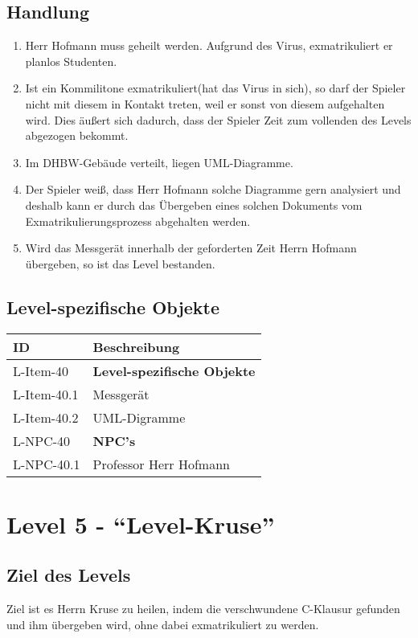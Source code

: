 \subsection{Handlung}
\begin{enumerate}
\item Herr Hofmann muss geheilt werden. Aufgrund des Virus, exmatrikuliert er planlos Studenten. 
\item Ist ein Kommilitone exmatrikuliert(hat das Virus in sich), so darf der Spieler nicht mit diesem in Kontakt treten, weil er sonst von diesem aufgehalten wird. Dies äußert sich dadurch, dass der Spieler Zeit zum vollenden des Levels abgezogen bekommt. 
\item Im DHBW-Gebäude verteilt, liegen UML-Diagramme. 
\item Der Spieler weiß, dass Herr Hofmann solche Diagramme gern analysiert und deshalb kann er durch das Übergeben eines solchen Dokuments vom Exmatrikulierungsprozess abgehalten werden.
\item Wird das Messgerät innerhalb der geforderten Zeit Herrn Hofmann übergeben, so ist das Level bestanden.
\end{enumerate}
\subsection{Level-spezifische Objekte}
\begin{tabularx}{\textwidth}{|l|l|}
\toprule
\textbf{ID} & \textbf{Beschreibung}\\
\endhead
\hline
L-Item-40 & \textbf{Level-spezifische Objekte} \\
L-Item-40.1 & Messgerät  \\
L-Item-40.2 & UML-Digramme \\
\hline
L-NPC-40 & \textbf{NPC's} \\
L-NPC-40.1 & Professor Herr Hofmann \\
\hline
\end{tabularx}



\section{Level 5 - \enquote{Level-Kruse}}
\subsection{Ziel des Levels}
Ziel ist es Herrn Kruse zu heilen, indem die verschwundene C-Klausur gefunden und ihm übergeben wird, ohne dabei exmatrikuliert zu werden.

